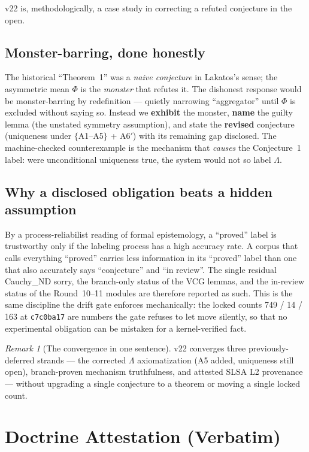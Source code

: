 \documentclass[11pt]{article}
\theoremstyle{plain}
\theoremstyle{definition}
\theoremstyle{remark}
\newtheorem{remark}[theorem]{Remark}
\newcommand{\La}{\Lambda}
\begin{document}
v22 is, methodologically, a case study in correcting a refuted conjecture in the
open.

\subsection{Monster-barring, done honestly}
The historical ``Theorem~1'' was a \emph{naive conjecture} in Lakatos's sense; the
asymmetric mean $\Phi$ is the \emph{monster} that refutes it. The dishonest response
would be monster-barring by redefinition --- quietly narrowing ``aggregator'' until
$\Phi$ is excluded without saying so. Instead we \textbf{exhibit} the monster,
\textbf{name} the guilty lemma (the unstated symmetry assumption), and state the
\textbf{revised} conjecture (uniqueness under $\{$A1--A5$\}$ + A6$'$) with its
remaining gap disclosed. The machine-checked counterexample is the mechanism that
\emph{causes} the Conjecture~1 label: were unconditional uniqueness true, the system
would not so label $\La$.

\subsection{Why a disclosed obligation beats a hidden assumption}
By a process-reliabilist reading of formal epistemology, a ``proved'' label is
trustworthy only if the labeling process has a high accuracy rate. A corpus that
calls everything ``proved'' carries less information in its ``proved'' label than one
that also accurately says ``conjecture'' and ``in review''. The single residual
Cauchy\_ND sorry, the branch-only status of the VCG lemmas, and the in-review status
of the Round~10--11 modules are therefore reported as such. This is the same
discipline the drift gate enforces mechanically: the locked counts 749 / 14 / 163 at
\texttt{c7c0ba17} are numbers the gate refuses to let move silently, so that no
experimental obligation can be mistaken for a kernel-verified fact.

\begin{remark}[The convergence in one sentence]
v22 converges three previously-deferred strands --- the corrected $\La$
axiomatization (A5 added, uniqueness still open), branch-proven mechanism
truthfulness, and attested SLSA L2 provenance --- without upgrading a single
conjecture to a theorem or moving a single locked count.
\end{remark}

\section{Doctrine Attestation (Verbatim)}
\end{document}
